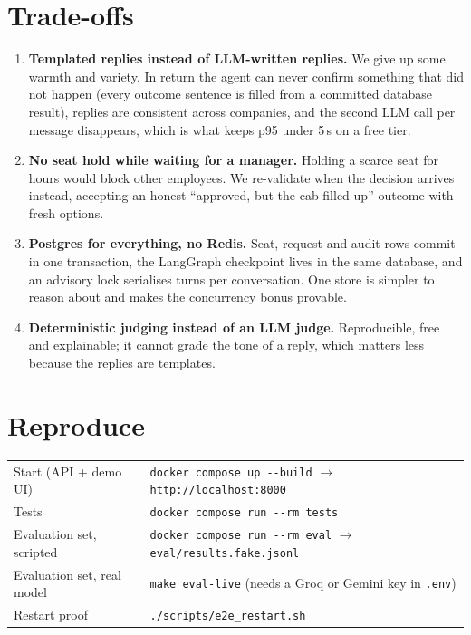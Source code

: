 \documentclass[10.5pt,a4paper]{article}
\begin{document}
\section{Trade-offs}
\begin{enumerate}
\item \textbf{Templated replies instead of LLM-written replies.} We give up some warmth and variety. In return the
  agent can never confirm something that did not happen (every outcome sentence is filled from a committed database
  result), replies are consistent across companies, and the second LLM call per message disappears, which is what
  keeps p95 under 5\,s on a free tier.
\item \textbf{No seat hold while waiting for a manager.} Holding a scarce seat for hours would block other employees.
  We re-validate when the decision arrives instead, accepting an honest ``approved, but the cab filled up'' outcome
  with fresh options.
\item \textbf{Postgres for everything, no Redis.} Seat, request and audit rows commit in one transaction, the LangGraph
  checkpoint lives in the same database, and an advisory lock serialises turns per conversation. One store is
  simpler to reason about and makes the concurrency bonus provable.
\item \textbf{Deterministic judging instead of an LLM judge.} Reproducible, free and explainable; it cannot grade the
  tone of a reply, which matters less because the replies are templates.
\end{enumerate}

\section{Reproduce}
\begin{tabular}{@{}ll@{}}
Start (API + demo UI) & \texttt{docker compose up -{}-build} \quad$\rightarrow$ \texttt{http://localhost:8000} \\
Tests & \texttt{docker compose run -{}-rm tests} \\
Evaluation set, scripted & \texttt{docker compose run -{}-rm eval} \quad$\rightarrow$ \texttt{eval/results.fake.jsonl} \\
Evaluation set, real model & \texttt{make eval-live} (needs a Groq or Gemini key in \texttt{.env}) \\
Restart proof & \texttt{./scripts/e2e\_restart.sh} \\
\end{tabular}
\end{document}

